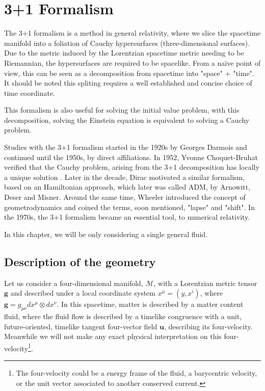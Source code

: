 \chapter{3+1 Formalism}

The 3+1 formalism is a method in general relativity, where we slice the spacetime manifold into a foliation of Cauchy hypersurfaces (three-dimensional surfaces). 
Due to the metric induced by the Lorentzian spacetime metric needing to be Riemannian, the hypersurfaces are required to be spacelike.
From a naïve point of view, this can be seen as a decomposition from spacetime into "space" + "time". It should be noted this spliting requires a well established and concise choice of time coordinate.

This formalism is also useful for solving the initial value problem, with this decomposition, solving the Einstein equation is equivalent to solving a Cauchy problem.

Studies with the 3+1 formalism started in the 1920s by Georges Darmois and continued until the 1950s, by direct affiliations. In 1952, Yvonne Choquet-Bruhat verified that the Cauchy problem, arising from the 3+1 decomposition has locally a unique solution \cite{}.
Later in the decade, Dirac motivated a similar formalism, based on an Hamiltonian approach, which later was called ADM, by Arnowitt, Deser and Misner\cite{}. Around the same time, Wheeler introduced the concept of geometrodynamics and coined the terms, soon mentioned, "lapse" and "shift". 
In the 1970s, the 3+1 formalism became an essential tool, to numerical relativity.

In this chapter, we will be only considering a single general fluid.

\section{Description of the geometry}

Let us consider a four-dimensional manifold, $\mathcal{M}$, with a Lorentzian metric tensor $\mathbf{g}$ and described under a local coordinate system $x^\mu=(y,x^i)$, where $\mathbf{g}=g_{\mu\nu}dx^\mu \otimes dx^\nu$. 
In this spacetime, matter is described by a matter content fluid, where the fluid flow is described by a timelike congruence with a unit, future-oriented, timelike tangent four-vector field $\mathbf{u}$, describing its four-velocity. 
Meanwhile we will not make any exact physical interpretation on this four-velocity\footnote{The four-velocity could be a energy frame of the fluid, a barycentric velocity, or the unit vector associated to another conserved current.}.

